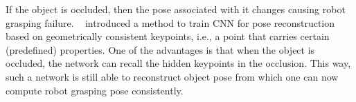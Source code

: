 If the object is occluded, then the pose associated with it changes causing robot grasping failure. \citeauthor{suwajanakorn2018discovery}~\cite{suwajanakorn2018discovery} introduced
a method to train \ac{CNN} for pose reconstruction based on geometrically consistent keypoints, i.e., a point that carries certain (predefined) properties.
One of the advantages is that when the object is occluded, the network can recall the hidden keypoints in the occlusion. This way, such a network is still able to reconstruct object pose from which
one can now compute robot grasping pose consistently.\\